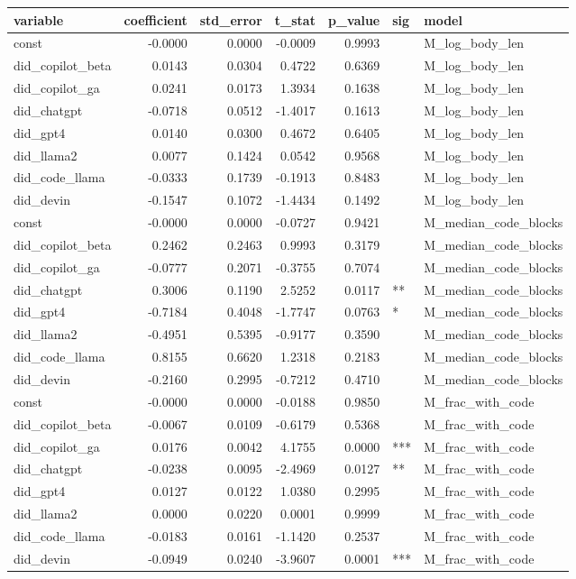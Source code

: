 \begin{tabular}{lrrrrll}
\toprule
variable & coefficient & std_error & t_stat & p_value & sig & model \\
\midrule
const & -0.0000 & 0.0000 & -0.0009 & 0.9993 &  & M_log_body_len \\
did_copilot_beta & 0.0143 & 0.0304 & 0.4722 & 0.6369 &  & M_log_body_len \\
did_copilot_ga & 0.0241 & 0.0173 & 1.3934 & 0.1638 &  & M_log_body_len \\
did_chatgpt & -0.0718 & 0.0512 & -1.4017 & 0.1613 &  & M_log_body_len \\
did_gpt4 & 0.0140 & 0.0300 & 0.4672 & 0.6405 &  & M_log_body_len \\
did_llama2 & 0.0077 & 0.1424 & 0.0542 & 0.9568 &  & M_log_body_len \\
did_code_llama & -0.0333 & 0.1739 & -0.1913 & 0.8483 &  & M_log_body_len \\
did_devin & -0.1547 & 0.1072 & -1.4434 & 0.1492 &  & M_log_body_len \\
const & -0.0000 & 0.0000 & -0.0727 & 0.9421 &  & M_median_code_blocks \\
did_copilot_beta & 0.2462 & 0.2463 & 0.9993 & 0.3179 &  & M_median_code_blocks \\
did_copilot_ga & -0.0777 & 0.2071 & -0.3755 & 0.7074 &  & M_median_code_blocks \\
did_chatgpt & 0.3006 & 0.1190 & 2.5252 & 0.0117 & ** & M_median_code_blocks \\
did_gpt4 & -0.7184 & 0.4048 & -1.7747 & 0.0763 & * & M_median_code_blocks \\
did_llama2 & -0.4951 & 0.5395 & -0.9177 & 0.3590 &  & M_median_code_blocks \\
did_code_llama & 0.8155 & 0.6620 & 1.2318 & 0.2183 &  & M_median_code_blocks \\
did_devin & -0.2160 & 0.2995 & -0.7212 & 0.4710 &  & M_median_code_blocks \\
const & -0.0000 & 0.0000 & -0.0188 & 0.9850 &  & M_frac_with_code \\
did_copilot_beta & -0.0067 & 0.0109 & -0.6179 & 0.5368 &  & M_frac_with_code \\
did_copilot_ga & 0.0176 & 0.0042 & 4.1755 & 0.0000 & *** & M_frac_with_code \\
did_chatgpt & -0.0238 & 0.0095 & -2.4969 & 0.0127 & ** & M_frac_with_code \\
did_gpt4 & 0.0127 & 0.0122 & 1.0380 & 0.2995 &  & M_frac_with_code \\
did_llama2 & 0.0000 & 0.0220 & 0.0001 & 0.9999 &  & M_frac_with_code \\
did_code_llama & -0.0183 & 0.0161 & -1.1420 & 0.2537 &  & M_frac_with_code \\
did_devin & -0.0949 & 0.0240 & -3.9607 & 0.0001 & *** & M_frac_with_code \\
\bottomrule
\end{tabular}
